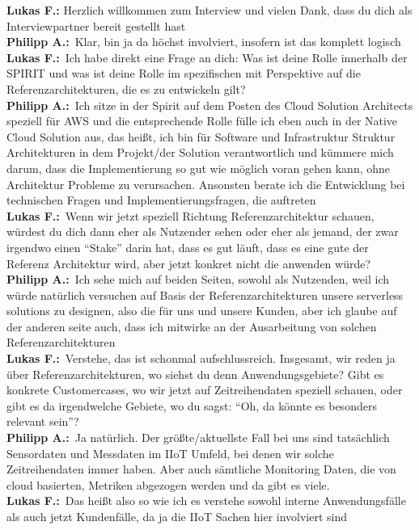 
\newcommand{\LF}{\\ \textbf{Lukas F.:}~}
\newcommand{\PA}{\\ \textbf{Philipp A.:}~}

\textbf{Lukas F.:} Herzlich willkommen zum Interview und vielen Dank, dass du dich als Interviewpartner bereit gestellt hast
\PA	 Klar, bin ja da höchst involviert, insofern ist das komplett logisch
\LF	Ich habe direkt eine Frage an dich: Was ist deine Rolle innerhalb der SPIRIT und was ist deine Rolle im spezifischen mit Perspektive auf die Referenzarchitekturen, die es zu entwickeln gilt?
\PA	Ich sitze in der Spirit auf dem Posten des Cloud Solution Architects speziell für AWS und die entsprechende Rolle fülle ich eben auch in der Native Cloud Solution aus, das heißt, ich bin für Software und Infrastruktur Struktur Architekturen in dem Projekt/der Solution verantwortlich und kümmere mich darum, dass die Implementierung so gut wie möglich voran gehen kann, ohne Architektur Probleme zu verursachen. Ansonsten berate ich die Entwicklung  bei technischen Fragen und Implementierungsfragen, die auftreten
\LF	Wenn wir jetzt speziell Richtung Referenzarchitektur schauen, würdest du dich dann eher als Nutzender sehen oder eher als jemand, der zwar irgendwo einen \enquote{Stake} darin hat, dass es gut läuft, dass es eine gute der Referenz Architektur wird, aber jetzt konkret nicht die anwenden würde?
\PA	 Ich sehe mich auf beiden Seiten, sowohl als Nutzenden, weil ich würde natürlich versuchen auf Basis der Referenzarchitekturen unsere serverless solutions zu designen, also die für uns und unsere Kunden, aber ich glaube auf der anderen seite auch, dass ich mitwirke an der Ausarbeitung von solchen Referenzarchitekturen
\LF	 Verstehe, das ist schonmal aufschlussreich. Insgesamt, wir reden ja über Referenzarchitekturen, wo siehst du denn Anwendungsgebiete? Gibt es konkrete Customercases, wo wir jetzt auf Zeitreihendaten speziell schauen, oder gibt es da irgendwelche Gebiete, wo du sagst: \enquote{Oh, da könnte es besonders relevant sein}?
\PA	 Ja natürlich. Der größte/aktuellste Fall bei uns sind tatsächlich Sensordaten und Messdaten im \ac{IIoT} Umfeld, bei denen wir solche Zeitreihendaten immer haben. Aber auch sämtliche Monitoring Daten, die von cloud basierten, Metriken abgezogen werden und da gibt es viele.
\LF	 Das heißt also so wie ich es verstehe sowohl interne Anwendungsfälle als auch jetzt Kundenfälle, da ja die \ac{IIoT} Sachen hier involviert sind

